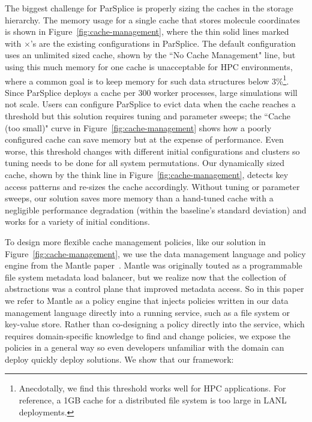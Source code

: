 The biggest challenge for ParSplice is properly sizing the caches in the
storage hierarchy.  The memory usage for a single cache that stores molecule
coordinates is shown in Figure~\ref{fig:cache-management}, where the thin solid
lines marked with \(\times\)'s are the existing configurations in ParSplice.
The default configuration uses an unlimited sized cache, shown by the ``No
Cache Management" line, but using this much memory for one cache is
unacceptable for HPC environments, where a common goal is to keep memory for
such data structures below 3\%\footnote{Anecdotally, we find this threshold
works well for HPC applications.  For reference, a 1GB cache for a distributed
file system is too large in LANL deployments.}. Since ParSplice deploys a cache
per 300 worker processes, large simulations will not scale.  Users can
configure ParSplice to evict data when the cache reaches a threshold but this
solution requires tuning and parameter sweeps; the ``Cache (too small)" curve
in Figure~\ref{fig:cache-management} shows how a poorly configured cache can
save memory but at the expense of performance.  Even worse, this threshold
changes with different initial configurations and clusters so tuning needs to
be done for all system permutations.  Our dynamically sized cache, shown by the
think line in Figure~\ref{fig:cache-management}, detects key access patterns
and re-sizes the cache accordingly.  Without tuning or parameter sweeps, our
solution saves more memory than a hand-tuned cache with a negligible
performance degradation (within the baseline's standard deviation) and works
for a variety of initial conditions.

To design more flexible cache management policies, like our solution in
Figure~\ref{fig:cache-management}, we use the data management language and
policy engine from the Mantle paper~\cite{sevilla:sc15-mantle}.  Mantle was
originally touted as a programmable file system metadata load balancer, but we
realize now that the collection of abstractions was a control plane that
improved metadata access. So in this paper we refer to Mantle as a policy
engine that injects policies written in our data management language directly
into a running service, such as a file system or key-value store.  Rather than
co-designing a policy directly into the service, which requires domain-specific
knowledge to find and change policies, we expose the policies in a general way
so even developers unfamiliar with the domain can deploy quickly deploy solutions.
We show that our framework:

